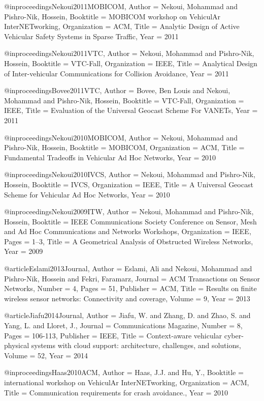 {{{{{{@inproceedings{Nekoui2011MOBICOM,
	Author = {Nekoui, Mohammad and Pishro-Nik, Hossein},
	Booktitle = {MOBICOM workshop on VehiculAr InterNETworking},
	Organization = {ACM},
	Title = {Analytic Design of Active Vehicular Safety Systems in Sparse Traffic},
	Year = {2011}}

@inproceedings{Nekoui2011VTC,
	Author = {Nekoui, Mohammad and Pishro-Nik, Hossein},
	Booktitle = {VTC-Fall},
	Organization = {IEEE},
	Title = {Analytical Design of Inter-vehicular Communications for Collision Avoidance},
	Year = {2011}}

@inproceedings{Bovee2011VTC,
	Author = {Bovee, Ben Louis and Nekoui, Mohammad and Pishro-Nik, Hossein},
	Booktitle = {VTC-Fall},
	Organization = {IEEE},
	Title = {Evaluation of the Universal Geocast Scheme For VANETs},
	Year = {2011}}

@inproceedings{Nekoui2010MOBICOM,
	Author = {Nekoui, Mohammad and Pishro-Nik, Hossein},
	Booktitle = {MOBICOM},
	Organization = {ACM},
	Title = {Fundamental Tradeoffs in Vehicular Ad Hoc Networks},
	Year = {2010}}

@inproceedings{Nekoui2010IVCS,
	Author = {Nekoui, Mohammad and Pishro-Nik, Hossein},
	Booktitle = {IVCS},
	Organization = {IEEE},
	Title = {A Universal Geocast Scheme for Vehicular Ad Hoc Networks},
	Year = {2010}}

@inproceedings{Nekoui2009ITW,
	Author = {Nekoui, Mohammad and Pishro-Nik, Hossein},
	Booktitle = {IEEE Communications Society Conference on Sensor, Mesh and Ad Hoc Communications and Networks Workshops},
	Organization = {IEEE},
	Pages = {1--3},
	Title = {A Geometrical Analysis of Obstructed Wireless Networks},
	Year = {2009}}

@article{Eslami2013Journal,
	Author = {Eslami, Ali and Nekoui, Mohammad and Pishro-Nik, Hossein and Fekri, Faramarz},
	Journal = {ACM Transactions on Sensor Networks},
	Number = {4},
	Pages = {51},
	Publisher = {ACM},
	Title = {Results on finite wireless sensor networks: Connectivity and coverage},
	Volume = {9},
	Year = {2013}}


@article{Jiafu2014Journal,
	Author = {Jiafu, W. and Zhang, D. and Zhao, S. and Yang, L. and Lloret, J.},
	Journal = {Communications Magazine},
	Number = {8},
	Pages = {106-113},
	Publisher = {IEEE},
	Title = {Context-aware vehicular cyber-physical systems with cloud support: architecture, challenges, and solutions},
	Volume = {52},
	Year = {2014}}

@inproceedings{Haas2010ACM,
	Author = {Haas, J.J. and Hu, Y.},
	Booktitle = {international workshop on VehiculAr InterNETworking},
	Organization = {ACM},
	Title = {Communication requirements for crash avoidance.},
	Year = {2010}}

}}}}}}
